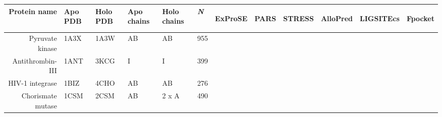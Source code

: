 \begin{table}
\begin{changemargin}{15mm}
\centering
\vspace*{-20mm}

\begin{scriptsize}
\begin{tabular}{ r p{0.8cm} p{0.8cm} p{0.8cm} p{0.8cm} l l l l l l l }
\hline
\textbf{Protein name} & \textbf{Apo PDB} & \textbf{Holo PDB} & \textbf{Apo chains} & \textbf{Holo chains} & \textit{\textbf{N}} & \begin{sideways}\textbf{ExProSE}\end{sideways} & \begin{sideways}\textbf{PARS}\end{sideways} & \begin{sideways}\textbf{STRESS}\end{sideways} & \begin{sideways}\textbf{AlloPred}\end{sideways} & \begin{sideways}\textbf{LIGSITEcs}\end{sideways} & \begin{sideways}\textbf{Fpocket}\end{sideways} \\
\hline
Pyruvate kinase                                          & 1A3X & 1A3W & AB    & AB    & 955 & \cellcolor[rgb]{ .573,  .816,  .314} & \cellcolor[rgb]{ .573,  .816,  .314} & \cellcolor[rgb]{ 1,  .494,  .475}    & \cellcolor[rgb]{ 1,  .494,  .475}    & \cellcolor[rgb]{ 1,  .494,  .475}    & \cellcolor[rgb]{ .573,  .816,  .314} \\
Antithrombin-III                                         & 1ANT & 3KCG & I     & I     & 399 & \cellcolor[rgb]{ 1,  .494,  .475}    & \cellcolor[rgb]{ 1,  .494,  .475}    & \cellcolor[rgb]{ 1,  .494,  .475}    & \cellcolor[rgb]{ 1,  .494,  .475}    & \cellcolor[rgb]{ 1,  .494,  .475}    & \cellcolor[rgb]{ 1,  .494,  .475}    \\
HIV-1 integrase                                          & 1BIZ & 4CHO & AB    & AB    & 276 & \cellcolor[rgb]{ 1,  .494,  .475}    & \cellcolor[rgb]{ .573,  .816,  .314} & \cellcolor[rgb]{ 1,  .494,  .475}    & \cellcolor[rgb]{ 1,  .494,  .475}    & \cellcolor[rgb]{ 1,  .494,  .475}    & \cellcolor[rgb]{ 1,  .494,  .475}    \\
Chorismate mutase                                        & 1CSM & 2CSM & AB    & 2 x A & 490 & \cellcolor[rgb]{ 1,  .494,  .475}    & \cellcolor[rgb]{ 1,  .494,  .475}    & \cellcolor[rgb]{ 1,  .494,  .475}    & \cellcolor[rgb]{ .573,  .816,  .314} & \cellcolor[rgb]{ 1,  .494,  .475}    & \cellcolor[rgb]{ .573,  .816,  .314} \\

\end{tabular}
\end{scriptsize}
\end{changemargin}
\end{table}
